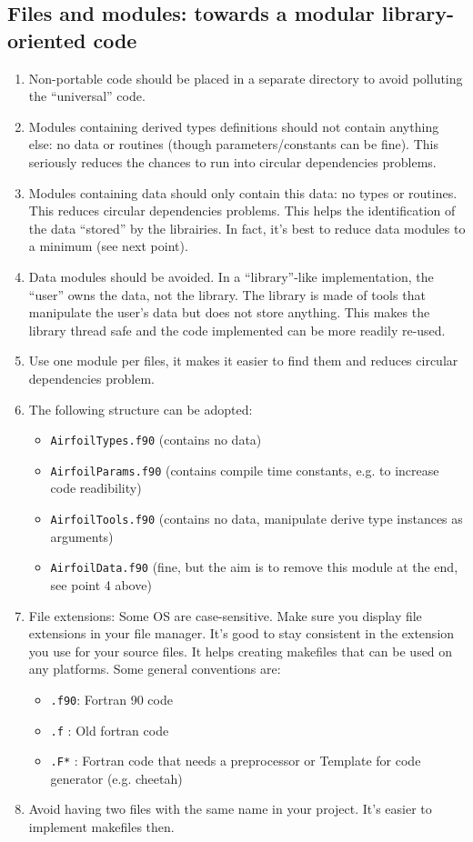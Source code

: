 \documentclass{article}
\begin{document}
\subsection{Files and modules: towards a modular library-oriented code}
\label{sec:modules}
\begin{enumerate}
    \item Non-portable code should be placed in a separate directory to avoid polluting the ``universal'' code.
    \item Modules containing derived types definitions should not contain anything else: no data or routines (though parameters/constants can be fine).  This seriously reduces the chances to run into circular dependencies problems. 
    \item Modules containing data should only contain this data: no types or routines. This reduces circular dependencies problems. This helps the identification of the data ``stored'' by the librairies. In fact, it's best to reduce data modules to a minimum (see next point).
    \item Data modules should be avoided. In a ``library''-like implementation, the ``user'' owns the data, not the library. The library is made of tools that manipulate the user's data but does not store anything. This makes the library thread safe and the code implemented can be more readily re-used.
    \item Use one module per files, it makes it easier to find them and reduces circular dependencies problem.
    \item The following structure can be adopted:
        \begin{itemize}
            \item \verb|AirfoilTypes.f90|  (contains no data)
            \item \verb|AirfoilParams.f90| (contains compile time constants, e.g. to increase code readibility)
            \item \verb|AirfoilTools.f90|  (contains no data, manipulate derive type instances as arguments)
            \item \verb|AirfoilData.f90| (fine, but the aim is to remove this module at the end, see point 4 above)
        \end{itemize}
    \item File extensions: Some OS are case-sensitive. Make sure you display file extensions in your file manager. It's good to stay consistent in the extension you use for your source files. It helps creating makefiles that can be used on any platforms. Some general conventions are:
        \begin{itemize}
            \item \verb|.f90|: Fortran 90 code
            \item \verb|.f|  : Old fortran code
            \item \verb|.F*|  : Fortran code that needs a preprocessor or Template for code generator (e.g. cheetah)
        \end{itemize}
    \item Avoid having two files with the same name in your project. It's easier to implement makefiles then.
\end{enumerate}
\end{document}
